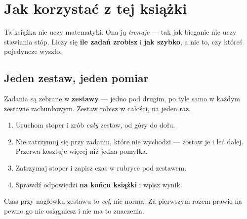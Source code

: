 %

\chapter*{Jak korzystać z tej książki}

Ta książka nie uczy matematyki. Ona ją \emph{trenuje} — tak jak bieganie nie
uczy stawiania stóp. Liczy się \textbf{ile zadań zrobisz} i \textbf{jak
szybko}, a nie to, czy któreś pojedyncze wyszło.

\section*{Jeden zestaw, jeden pomiar}

Zadania są zebrane w \textbf{zestawy} — jedno pod drugim, po tyle samo
w każdym zestawie rachunkowym.
Zestaw robisz w całości, na jeden raz.

\begin{enumerate}
  \item Uruchom stoper i zrób \emph{cały} zestaw, od góry do dołu.
  \item Nie zatrzymuj się przy zadaniu, które nie wychodzi — zostaw je i leć
        dalej. Przerwa kosztuje więcej niż jedna pomyłka.
  \item Zatrzymaj stoper i zapisz czas w rubryce pod zestawem.
  \item Sprawdź odpowiedzi \textbf{na końcu książki} i wpisz wynik.
\end{enumerate}

\noindent
Czas przy nagłówku zestawu to \emph{cel}, nie norma. Za pierwszym razem prawie
na pewno go nie osiągniesz i nie ma to znaczenia.

